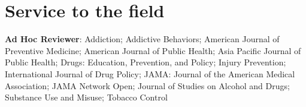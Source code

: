 \documentclass[11pt, letterpaper]{article}
\begin{document}
\section*{Service to the field}
\textbf{Ad Hoc Reviewer}: Addiction; Addictive Behaviors; American Journal of Preventive Medicine; American Journal of Public Health; Asia Pacific Journal of Public Health; Drugs: Education, Prevention, and Policy; Injury Prevention; International Journal of Drug Policy; JAMA: Journal of the American Medical Association; JAMA Network Open; Journal of Studies on Alcohol and Drugs; Substance Use and Misuse; Tobacco Control

%
\end{document}
